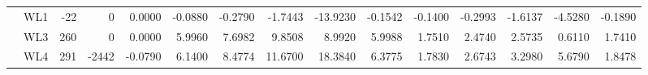 \begin{tabular}{llrrrrrrrrrrrrr}
    & WL1 &        -22 &          0 &     0.0000 &                      -0.0880 & -0.2790 & -1.7443 & -13.9230 & -0.1542 &               -0.1400 & -0.2993 & -1.6137 & -4.5280 & -0.1890 \\
    & WL3 &        260 &          0 &     0.0000 &                       5.9960 &  7.6982 &  9.8508 &   8.9920 &  5.9988 &                1.7510 &  2.4740 &  2.5735 &  0.6110 &  1.7410 \\
    & WL4 &        291 &      -2442 &    -0.0790 &                       6.1400 &  8.4774 & 11.6700 &  18.3840 &  6.3775 &                1.7830 &  2.6743 &  3.2980 &  5.6790 &  1.8478 \\
\bottomrule
\end{tabular}
